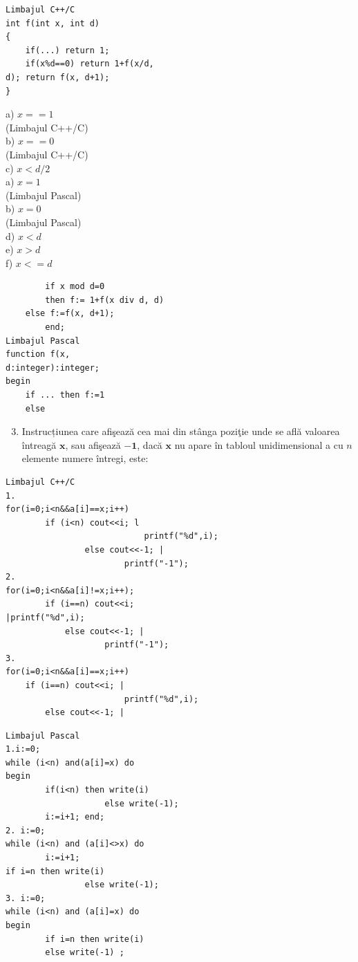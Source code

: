 \documentclass[10pt]{article}
\begin{document}
\begin{verbatim}
Limbajul C++/C
int f(int x, int d)
{
    if(...) return 1;
    if(x%d==0) return 1+f(x/d,
d); return f(x, d+1);
}
\end{verbatim}

a) $x==1$\\
(Limbajul C++/C)\\
b) $x==0$\\
(Limbajul C++/C)\\
c) $x<d / 2$\\
a) $x=1$\\
(Limbajul Pascal)\\
b) $x=0$\\
(Limbajul Pascal)\\
d) $x<d$\\
e) $x>d$\\
f) $x<=d$

\begin{verbatim}
        if x mod d=0
        then f:= 1+f(x div d, d)
    else f:=f(x, d+1);
        end;
Limbajul Pascal
function f(x,
d:integer):integer;
begin
    if ... then f:=1
    else
\end{verbatim}

\begin{enumerate}
  \setcounter{enumi}{2}
  \item Instrucțiunea care afişează cea mai din stânga poziţie unde se află valoarea întreagă $\mathbf{x}$, sau afişează $\mathbf{- 1}$, dacă $\mathbf{x}$ nu apare în tabloul unidimensional a cu $n$ elemente numere întregi, este:
\end{enumerate}

\begin{verbatim}
Limbajul C++/C
1.
for(i=0;i<n&&a[i]==x;i++)
        if (i<n) cout<<i; l
                            printf("%d",i);
                else cout<<-1; |
                        printf("-1");
2.
for(i=0;i<n&&a[i]!=x;i++);
        if (i==n) cout<<i;
|printf("%d",i);
            else cout<<-1; |
                    printf("-1");
3.
for(i=0;i<n&&a[i]==x;i++)
    if (i==n) cout<<i; |
                        printf("%d",i);
        else cout<<-1; |
\end{verbatim}

\begin{verbatim}
Limbajul Pascal
1.i:=0;
while (i<n) and(a[i]=x) do
begin
        if(i<n) then write(i)
                    else write(-1);
        i:=i+1; end;
2. i:=0;
while (i<n) and (a[i]<>x) do
        i:=i+1;
if i=n then write(i)
                else write(-1);
3. i:=0;
while (i<n) and (a[i]=x) do
begin
        if i=n then write(i)
        else write(-1) ;
\end{verbatim}
\end{document}
